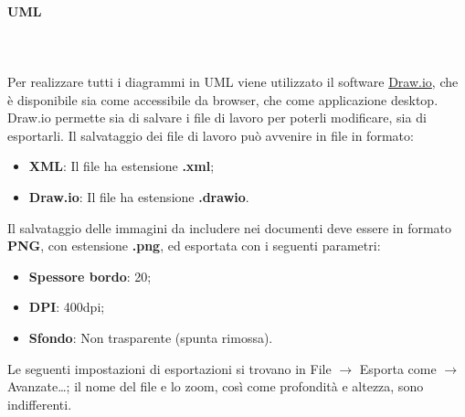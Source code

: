 \paragraph{UML}\mbox{}\\ \\
Per realizzare tutti i diagrammi in UML viene utilizzato il software \href{https://draw.io}{Draw.io}, che è disponibile sia come  accessibile da browser, che come applicazione desktop.
Draw.io permette sia di salvare i file di lavoro per poterli modificare, sia di esportarli.
Il salvataggio dei file di lavoro può avvenire in file in formato:
\begin{itemize}
    \item \textbf{XML}: Il file ha estensione \textbf{.xml};
    \item \textbf{Draw.io}: Il file ha estensione \textbf{.drawio}.
\end{itemize}
Il salvataggio delle immagini da includere nei documenti deve essere in formato \textbf{PNG}, con estensione \textbf{.png}, ed esportata con i seguenti parametri:
\begin{itemize}
    \item \textbf{Spessore bordo}: 20;
    \item \textbf{DPI}: 400dpi;
    \item \textbf{Sfondo}: Non trasparente (spunta rimossa).
\end{itemize}
Le seguenti impostazioni di esportazioni si trovano in File $\rightarrow$ Esporta come $\rightarrow$ Avanzate\dots; il nome del file e lo zoom, così come profondità e altezza, sono indifferenti.
